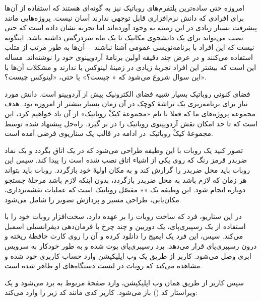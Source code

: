 \documentclass{cake-classes/short-report-fa}
\newcommand{\کیک}{مجموعهٔ کیکْ روباتیک}
\begin{document}
امروزه حتی ساده‌ترین پلتفرم‌های روباتیک نیز به گونه‌ای هستند که استفاده از آن‌ها برای افرادی که دانش نرم‌افزاری قابل توجهی ندارند آسان نیست.
پروژه‌هایی مانند  پیشرفت بسیار زیادی در این زمینه به وجود آورده‌اند اما تجربه نشان داده است که حتی نصب  می‌تواند برای یک دانشجوی مکانیک تا یک ماه سردرگمی داشته باشد.
اینگونه نیست که این افراد با برنامه‌نویسی عمومی آشنا نباشند ---آن‌ها به طور مرتب از متلب استفاده می‌کنند و در عرض چند دقیقه اولین برنامهٔ آردویینوی خود را نوشته‌اند.
مساله این است که بیشتر این افراد تجربهٔ زیادی در زمینهٔ لینوکس یا  ندارند و مشکلات آن‌ها با این سوال شروع می‌شود که « چیست؟» یا حتی، «لینوکس چیست؟».

فضای کنونی روباتیک بسیار شبیه فضای الکترونیک پیش از آردویینو است. دانش مورد نیاز برای برنامه‌ریزی یک تراشهٔ کوچک در آن زمان بسیار بیشتر از امروزه بود. هدف مجموعه پروژه‌های ما که فعلا با نام «\کیک» از آن یاد خواهیم کرد، این است که تا حد امکان نقش آردویینوی روباتیک را در بر گیرد. راه‌حل پیشنهاد شده توسط \کیک\ در ادامه در قالب یک سناریوی فرضی آمده است.


تصور کنید یک روبات با این وظیفه طراحی می‌شود که در یک اتاق بگردد و یک نماد ضربدر قرمز رنگ که روی یکی از اشیاء اتاق نصب شده است را پیدا کند.
سپس این روبات باید محل ضربدر را گزارش کند و به مکان اولیهٔ خود بازگردد.
روبات باید بتواند هر زمان که لازم باشد به محل ضربدر بازگردد، بدون اینکه لازم باشد مرحلهٔ جستجو دوباره انجام شود.
این وظیفه یک «» مفصّل روباتیک است که عملیات نقشه‌برداری، مکان‌یابی، طراحی مسیر و پردازش تصویر را شامل می‌شود.

در این سناریو، فرد که ساخت روبات را بر عهده دارد، سخت‌افزار روبات خود را با استفاده از یک رسپبری‌پای، یک دوربین و چند چرخ با فرمان‌دهی دیفرانسیلی اسمبل می‌کند.
سپس، این فرد یک ایمیج  را دانلود کرده و آن را روی کارت حافظهٔ  ریخته و درون رسپبری‌پای قرار می‌دهد.
برد رسپبری‌پای بوت شده و به طور خودکار به سرویس ابری وصل می‌شود.
کاربر از طریق یک وب اپلیکیشن وارد حساب کاربری خود شده و مشاهده می‌کند که روبات در لیست دستگاه‌های او ظاهر شده است.

سپس کاربر از طریق همان وب اپلیکیشن، وارد صفحهٔ مربوط به برد می‌شود و یک ویراستار کد ()‌ باز می‌شود. کاربر کدی مانند کد زیر را وارد می‌کند:
\end{document}
